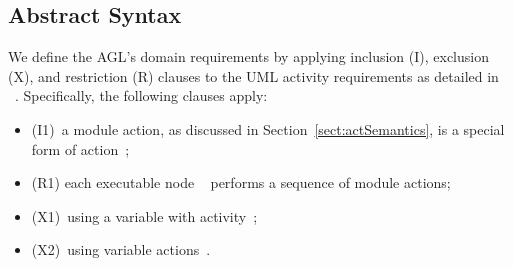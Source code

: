 %
\subsection{Abstract Syntax} 
\label{subsect:agl-abstractSyntax}


We define the AGL's domain requirements by applying inclusion (I), exclusion (X), and restriction (R) clauses to the UML activity requirements as detailed in ~\cite[p.~373]{omg_unified_2017}. Specifically, the following clauses apply: 
\begin{itemize}
	\item (I1)~a module action, as discussed in Section~\ref{sect:actSemantics}, is a special form of action~\cite[p.~441]{omg_unified_2017};
	\item (R1) each executable node ~\cite[p.~403]{omg_unified_2017} performs a sequence of module actions;
	\item (X1)~using a variable with activity~\cite[p.~377]{omg_unified_2017}; 
	\item (X2)~using variable actions~\cite[p.~469]{omg_unified_2017}.
\end{itemize}
  

